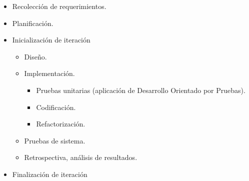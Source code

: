 \begin{itemize}
	\itemsep1pt \parskip1pt 
	\item Recolección de requerimientos.
	\item Planificación.
	\item Inicialización de iteración
	\begin{itemize}
		\item Diseño.
		\item Implementación.
		\begin{itemize}
			\item Pruebas unitarias (aplicación de Desarrollo Orientado por Pruebas).
			\item Codificación.
			\item Refactorización.
		\end{itemize}
		\item Pruebas de sistema.
		\item Retrospectiva, análisis de resultados.
	\end{itemize}
	\item Finalización de iteración
\end{itemize}